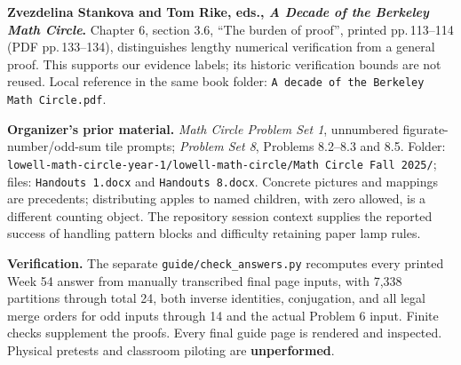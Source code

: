 \documentclass[letterpaper,11pt]{article}
\begin{document}
\textbf{Zvezdelina Stankova and Tom Rike, eds., \emph{A Decade of the Berkeley Math Circle}.} Chapter 6, section 3.6, ``The burden of proof'', printed pp.\,113--114 (PDF pp.\,133--134), distinguishes lengthy numerical verification from a general proof. This supports our evidence labels; its historic verification bounds are not reused. Local reference in the same book folder: \texttt{A decade of the Berkeley Math Circle.pdf}.

\textbf{Organizer's prior material.} \emph{Math Circle Problem Set 1}, unnumbered figurate-number/odd-sum tile prompts; \emph{Problem Set 8}, Problems 8.2--8.3 and 8.5. Folder: \nolinkurl{lowell-math-circle-year-1/lowell-math-circle/}\newline\texttt{Math Circle Fall 2025/}; files: \texttt{Handouts 1.docx} and \texttt{Handouts 8.docx}. Concrete pictures and mappings are precedents; distributing apples to named children, with zero allowed, is a different counting object. The repository session context supplies the reported success of handling pattern blocks and difficulty retaining paper lamp rules. 

\textbf{Verification.} The separate \texttt{guide/check\_answers.py} recomputes every printed Week 54 answer from manually transcribed final page inputs, with 7,338 partitions through total 24, both inverse identities, conjugation, and all legal merge orders for odd inputs through 14 and the actual Problem 6 input. Finite checks supplement the proofs. Every final guide page is rendered and inspected. Physical pretests and classroom piloting are \textbf{unperformed}.
\end{document}
